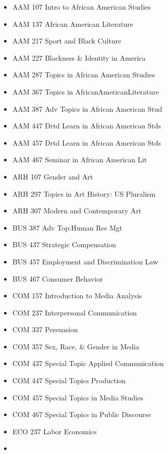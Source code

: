 \documentclass[
  letterpaper,
]{scrbook}
\providecommand{\tightlist}{%
  \setlength{\itemsep}{0pt}\setlength{\parskip}{0pt}}
\begin{document}
\begin{itemize}
\tightlist
\item
  AAM 107 Intro to African American Studies
\item
  AAM 137 African American Literature\\
\item
  AAM 217 Sport and Black Culture\\
\item
  AAM 227 Blackness \& Identity in America
\item
  AAM 287 Topics in African American Studies
\item
  AAM 367 Topics in AfricanAmericanLiterature
\item
  AAM 387 Adv Topics in African American Stud
\item
  AAM 447 Drtd Learn in African American Stds
\item
  AAM 457 Drtd Learn in African American Stds
\item
  AAM 467 Seminar in African American Lit
\item
  ARH 107 Gender and Art\\
\item
  ARH 297 Topics in Art History: US Pluralism\\
\item
  ARH 307 Modern and Contemporary Art
\item
  BUS 387 Adv Top:Human Res Mgt
\item
  BUS 437 Strategic Compensation\\
\item
  BUS 457 Employment and Discrimination Law
\item
  BUS 467 Consumer Behavior
\item
  COM 157 Introduction to Media Analysis
\item
  COM 237 Interpersonal Communication
\item
  COM 337 Persuasion\\
\item
  COM 357 Sex, Race, \& Gender in Media
\item
  COM 437 Special Topic Applied Communication
\item
  COM 447 Special Topics Production
\item
  COM 457 Special Topics in Media Studies
\item
  COM 467 Special Topics in Public Discourse
\item
  ECO 237 Labor Economics\\
\item

\end{itemize}
\end{document}
